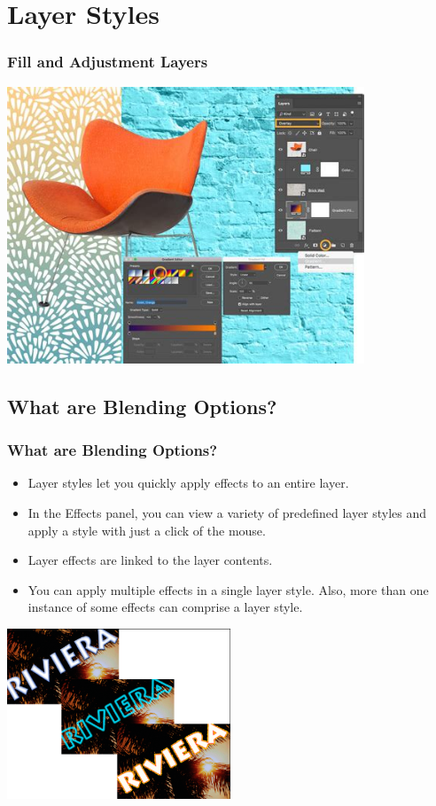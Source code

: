 \documentclass{beamer}
\begin{document}
		
	\section{Layer Styles}
		\begin{frame}
		\frametitle{Fill and Adjustment Layers}
		\begin{center}
			\includegraphics[width = 0.8\textwidth]{images/adjust and fill layers.jpg}
		\end{center}
	\end{frame}
	
	\subsection{What are Blending Options?}
	\begin{frame}
		\frametitle{What are Blending Options?}
		\begin{itemize}
			\item Layer styles let you quickly apply effects to an entire layer.
			\item In the Effects panel, you can view a variety of predefined layer styles and apply a style with just a click of the mouse.
			\item Layer effects are linked to the layer contents.
			\item You can apply multiple effects in a single layer style. Also, more than one instance of some effects can comprise a layer style.
		\end{itemize}
		\begin{center}
			\includegraphics[width = 0.5\textwidth]{images/layer styles.png}
		\end{center}
	\end{frame}
	
\end{document}
